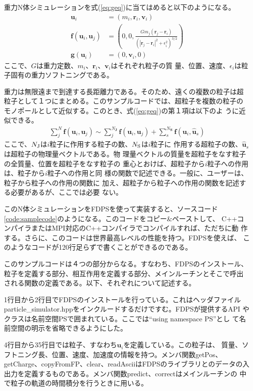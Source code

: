 \documentclass[12pt,a4paper]{jarticle}
\begin{document}
重力N体シミュレーションを式(\ref{eq:geq})に当てはめると以下のようになる。
\begin{align}
  \bm{u}_i &= (m_i, \bm{r}_i, \bm{v}_i) \\
  \bm{f}(\bm{u}_i, \bm{u}_j) &= \left( 0, 0, \frac{G m_j (\bm{r}_j -
    \bm{r}_i)}{(|\bm{r}_j-\bm{r}_i|^2+\epsilon_i^2)^{3/2}} \right) \\
  \bm{g}(\bm{u}_i) &= (0, \bm{v}_i, 0)
\end{align}
ここで、$G$は重力定数、$m_i$、$\bm{r}_i$、$\bm{v}_i$はそれぞれ粒子の質
量、位置、速度、$\epsilon_i$は粒子固有の重力ソフトニングである。

重力は無限遠まで到達する長距離力である。そのため、遠くの複数の粒子は超
粒子として１つにまとめる。このサンプルコードでは、超粒子を複数の粒子の
モノポールとして近似する。このとき、式(\ref{eq:geq})の第１項は以下のよ
うに近似できる。
\begin{align}
  \sum_j^N \bm{f}(\bm{u}_i,\bm{u}_j) \sim \sum_j^{N_\textbf{J}}
  \bm{f}(\bm{u}_i,\bm{u}_j) + \sum_s^{N_\textbf{S}}
  \bm{f}(\bm{u}_i,\bm{\hat{u}}_s)
\end{align}
ここで、$N_{\rm J}$は$i$粒子に作用する粒子の数、$N_{\rm S}$は$i$粒子に
作用する超粒子の数、$\bm{\hat{u}}_s$は超粒子の物理量ベクトルである。物
理量ベクトルの質量を超粒子をなす粒子の全質量、位置を超粒子をなす粒子の
重心とおけば、超粒子から$i$粒子への作用は、粒子から$i$粒子への作用と同
様の関数で記述できる。一般に、ユーザーは、粒子から粒子への作用の関数に
加え、超粒子から粒子への作用の関数を記述する必要があるが、ここでは必要
ない。

このN体シミュレーションをFDPSを使って実装すると、ソースコード
\ref{code:samplecode}のようになる。このコードをコピー\&ペーストして、
C++コンパイラまたはMPI対応のC++コンパイラでコンパイルすれば、ただちに動
作する。さらに、このコードは世界最高レベルの性能を持つ。FDPSを使えば、
このようなコードが120行足らずで書くことができるのである。

このサンプルコードは４つの部分からなる。すなわち、FDPSのインストール、
粒子を定義する部分、相互作用を定義する部分、メインルーチンとそこで呼出
される関数の定義である。以下、それぞれについて記述する。

1行目から2行目でFDPSのインストールを行っている。これはヘッダファイル
particle\_simulator.hppをインクルードするだけですむ。FDPSが提供するAPI
やクラスは名前空間PSで囲まれている。ここでは``using namespace PS''とし
て名前空間の明示を省略できるようにした。%

4行目から35行目では粒子、すなわち$\bm{u}_i$を定義している。この粒子は、
質量、ソフトニング長、位置、速度、加速度の情報を持つ。メンバ関数getPos、
getCharge、copyFromFP、clear、readAsciiはFDPSのライブラリとのデータの入
出力を定義するものである。メンバ関数predict、correctはメインルーチンの
中で粒子の軌道の時間積分を行うときに用いる。
\end{document}
